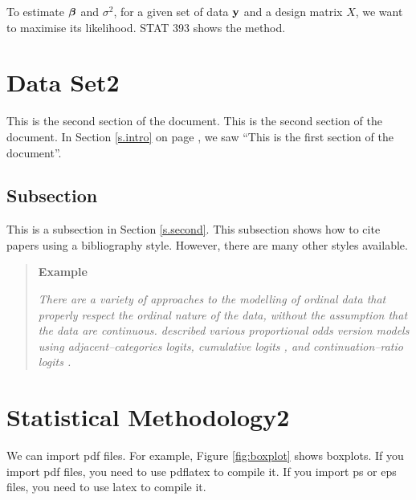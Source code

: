 \documentclass[12pt]{article}
\newcommand{\ubeta}{\mbox{\boldmath$\beta$}}
\begin{document}
To estimate $\ubeta$ and $\sigma^2$, for a given set of data ${\bf y}$ and a
design matrix $X$, we want to maximise its likelihood.  STAT 393 shows the method.


\section{Data Set2}

\label{s.c2}

This is the second section of the document. This is the second section of the 
document. In Section \ref{s.intro} on page \pageref{s.intro}, we saw ``This is 
the first section of the document''.

\subsection{Subsection}

\label{ss.a}

This is a subsection in Section \ref{s.second}. This subsection shows how to 
cite papers using a bibliography style.  However, there are many other styles 
available.

\begin{quote}
{\bf Example}

{\em There are a variety of approaches to the modelling of ordinal data
that properly respect the ordinal nature of the data, without the
assumption that the data are continuous.  \cite{Liu05}
 described various proportional odds version
models using adjacent--categories logits, cumulative logits
\citep{McC80}, and continuation--ratio logits \citep{McC89}.}
\end{quote}

\section{Statistical Methodology2}

\label{s.statisticalmethodology2}

We can import pdf files.  For example, Figure \ref{fig:boxplot} shows boxplots. 
If you import pdf files, you need to use pdflatex to 
compile it. If you import ps or eps files, you need to use latex to compile it. 
\end{document}
